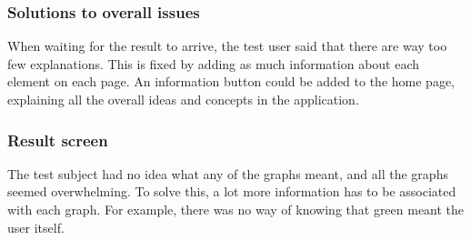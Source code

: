 \subsubsection{Solutions to overall issues}
When waiting for the result to arrive, the test user said that there are way too
few explanations. This is fixed by adding as much information about each element
on each page. An information button could be added to the home page, explaining
all the overall ideas and concepts in the application.

\subsubsection{Result screen}
The test subject had no idea what any of the graphs meant, and all the graphs
seemed overwhelming. To solve this, a lot more information has to be
associated with each graph. For example, there was no way of knowing that green
meant the user itself. 


